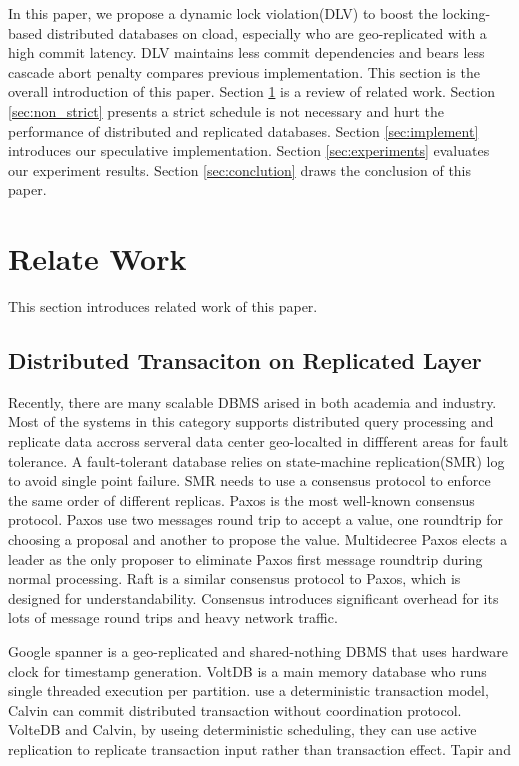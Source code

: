 \documentclass[conference]{IEEEtran}
\begin{document}
In this paper, we propose a dynamic lock violation(DLV) to boost the locking-based distributed databases on cload, especially who are geo-replicated with a high commit latency.
DLV maintains less commit dependencies and bears less cascade abort penalty compares previous implementation\cite{CLV:conf/sigmod/GraefeLKTV13}. 
This section is the overall introduction of this paper.
Section \ref{sec:relate_work} is a review of related work.
Section \ref{sec:non_strict} presents a strict schedule is not necessary and hurt the performance of distributed and replicated databases.
Section \ref{sec:implement} introduces our speculative implementation.
Section \ref{sec:experiments} evaluates our experiment results.
Section \ref{sec:conclution} draws the conclusion of this paper.


\section{Relate Work}
\label{sec:relate_work}
This section introduces related work of this paper.

\subsection{Distributed Transaciton on Replicated Layer}
Recently, there are many scalable DBMS arised in both academia and industry.
Most of the systems in this category supports distributed query processing and
replicate data accross serveral data center geo-localted in diffferent areas for fault tolerance.
A fault-tolerant database relies on state-machine replication(SMR) log to avoid single point failure.
SMR needs to use a consensus protocol to enforce the same order of different replicas.
Paxos\cite{Paxos:journals/tocs/Lamport98}\cite{PaxosSimple:conf/opodis/Lamport02} is the most well-known consensus protocol.
Paxos use two messages round trip to accept a value, one roundtrip for choosing a proposal and another to propose the value.
Multidecree Paxos\cite{Multidecree:journals/csur/RenesseA15} elects a leader as the only proposer to eliminate Paxos first message roundtrip during normal processing.
Raft\cite{Raft:conf/usenix/OngaroO14} is a similar consensus protocol to Paxos, which is designed for understandability.
Consensus introduces significant overhead for its lots of message round trips and heavy network traffic.


Google spanner \cite{Spanner:conf/osdi/CorbettDEFFFGGHHHKKLLMMNQRRSSTWW12}\cite{Spanner:conf/sigmod/BaconBBCDFFGJKL17} is a geo-replicated and shared-nothing DBMS that uses hardware clock for timestamp generation.
VoltDB \cite{VoltDB} is a main memory database who runs single threaded execution per partition.
\cite{Calvin:conf/sigmod/ThomsonDWRSA12} use a deterministic transaction model, 
Calvin can commit distributed transaction without coordination protocol.
VolteDB and Calvin, by useing deterministic scheduling, they can use active replication to replicate transaction input rather than transaction effect.
Tapir\cite{Tapir:conf/sosp/ZhangSSKP15} and 
\end{document}
